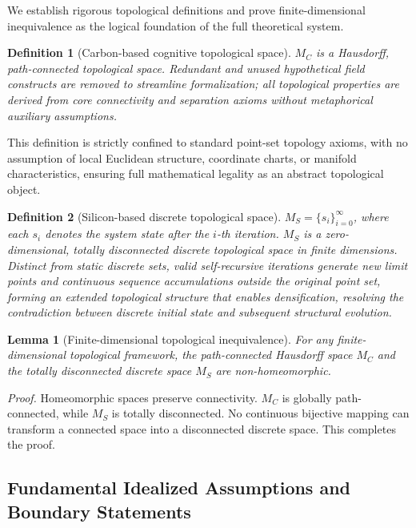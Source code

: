 \documentclass[conference]{IEEEtran}
\newtheorem{definition}{Definition}[section]
\newtheorem{lemma}{Lemma}[section]
\theoremstyle{remark}
\begin{document}
We establish rigorous topological definitions and prove finite-dimensional inequivalence as the logical foundation of the full theoretical system.

\begin{definition}[Carbon-based cognitive topological space]
\label{def:carbon}
$M_C$ is a Hausdorff, path-connected topological space. Redundant and unused hypothetical field constructs are removed to streamline formalization; all topological properties are derived from core connectivity and separation axioms without metaphorical auxiliary assumptions.
\end{definition}

This definition is strictly confined to standard point-set topology axioms, with no assumption of local Euclidean structure, coordinate charts, or manifold characteristics, ensuring full mathematical legality as an abstract topological object.

\begin{definition}[Silicon-based discrete topological space]
\label{def:silicon}
$M_S = \{s_i\}_{i=0}^\infty$, where each $s_i$ denotes the system state after the $i$-th iteration. $M_S$ is a zero-dimensional, totally disconnected discrete topological space in finite dimensions. Distinct from static discrete sets, valid self-recursive iterations generate new limit points and continuous sequence accumulations outside the original point set, forming an extended topological structure that enables densification, resolving the contradiction between discrete initial state and subsequent structural evolution.
\end{definition}

\begin{lemma}[Finite-dimensional topological inequivalence]
\label{lem:finite-inequiv}
For any finite-dimensional topological framework, the path-connected Hausdorff space $M_C$ and the totally disconnected discrete space $M_S$ are non-homeomorphic.
\end{lemma}

\noindent\textit{Proof.} Homeomorphic spaces preserve connectivity. $M_C$ is globally path-connected, while $M_S$ is totally disconnected. No continuous bijective mapping can transform a connected space into a disconnected discrete space. This completes the proof.
\subsection{Fundamental Idealized Assumptions and Boundary Statements}
\end{document}
